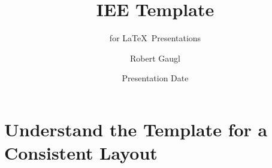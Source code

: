 \documentclass[aspectratio=169]{beamer}
\title[Short Title]{IEE Template}
\subtitle{for \LaTeX~Presentations}
\author{Robert Gaugl}
\date{Presentation Date}
\institute{Institute of Electricity Economics and Energy Innovation}
\begin{document}
\begin{frame}[plain]
    \maketitleslide
\end{frame}


\section{Understand the \textbf{Template} for a Consistent Layout}

\begin{frame}
\end{frame}
\end{document}
